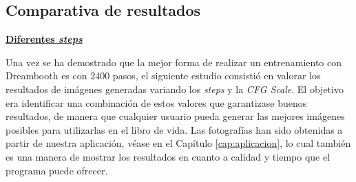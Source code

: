 








\subsection{Comparativa de resultados}

\textbf{\underline{Diferentes \textit{steps}}}

Una vez se ha demostrado que la mejor forma de realizar un entrenamiento con Dreambooth es con 2400 pasos, el siguiente estudio consistió en valorar los resultados de imágenes generadas variando los \textit{steps} y la\textit{ CFG Scale}. El objetivo era identificar una combinación de estos valores que garantizase buenos resultados, de manera que cualquier usuario pueda generar las mejores imágenes posibles para utilizarlas en el libro de vida. Las fotografías han sido obtenidas a partir de nuestra aplicación, véase en el Capítulo \ref{cap:aplicacion}, lo cual también es una manera de mostrar los resultados en cuanto a calidad y tiempo que el programa puede ofrecer.

